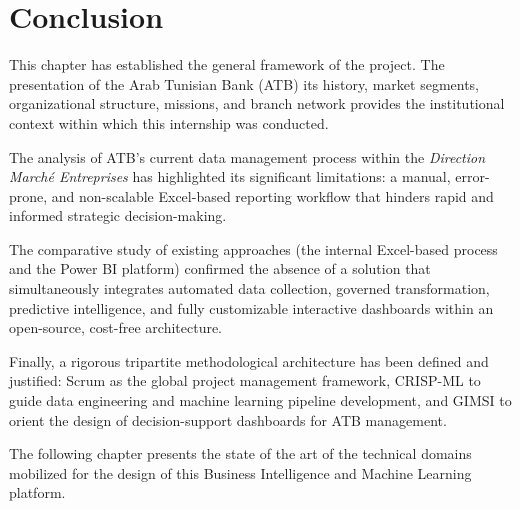 \section{Conclusion}

This chapter has established the general framework of the project. The presentation of the
Arab Tunisian Bank (ATB)  its history, market segments, organizational structure,
missions, and branch network provides the institutional context within which this
internship was conducted.

The analysis of ATB's current data management process within the \textit{Direction March\'{e}
Entreprises} has highlighted its significant limitations: a manual, error-prone, and
non-scalable Excel-based reporting workflow that hinders rapid and informed strategic
decision-making.

The comparative study of existing approaches (the internal Excel-based process and the
Power BI platform) confirmed the absence of a solution that simultaneously integrates
automated data collection, governed transformation, predictive intelligence, and fully
customizable interactive dashboards within an open-source, cost-free architecture.

Finally, a rigorous tripartite methodological architecture has been defined and
justified: Scrum as the global project management framework, CRISP-ML to
guide data engineering and machine learning pipeline development, and GIMSI to
orient the design of decision-support dashboards for ATB management.

The following chapter presents the state of the art of the technical domains mobilized for
the design of this Business Intelligence and Machine Learning platform.
